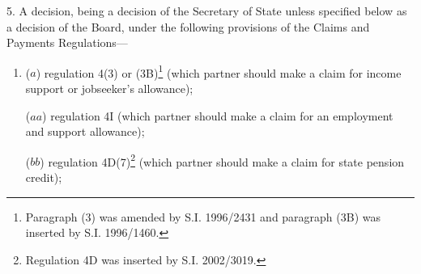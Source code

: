 \documentclass[12pt,a4paper]{article}
\begin{document}
5.  A decision, being a decision of the Secretary of State unless specified below as a decision of the Board, under the following provisions of the Claims and Payments Regulations—
\begin{enumerate}\item[]

($a$) regulation 4(3) or (3B)\footnote{Paragraph (3) was amended by S.I. 1996/2431 and paragraph (3B) was inserted by S.I. 1996/1460.} (which partner should make a claim for income support or jobseeker’s allowance);

($aa$) regulation 4I (which partner should make a claim for an employment and support allowance);



($bb$) regulation 4D(7)\footnote{Regulation 4D was inserted by S.I. 2002/3019.} (which partner should make a claim for state pension credit);

%
%


\end{enumerate}
\end{document}
